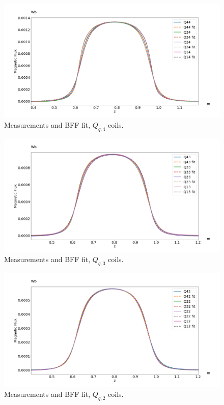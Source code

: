 \begin{figure}[!h]
    \centering
    \includegraphics[width=\linewidth]{figs/Q4fit}
    \caption{Measurements and BFF fit, $Q_{q,4}$ coils.}
    \label{fig:Q4fit}
\end{figure}

\begin{figure}[!h]
    \centering
    \includegraphics[width=\linewidth]{figs/Q3fit}
    \caption{Measurements and BFF fit, $Q_{q,3}$ coils.}
    \label{fig:Q3fit}
\end{figure}

\begin{figure}[!h]
    \centering
    \includegraphics[width=\linewidth]{figs/Q2fit}
    \caption{Measurements and BFF fit, $Q_{q,2}$ coils.}
    \label{fig:Q2fit}
\end{figure}

